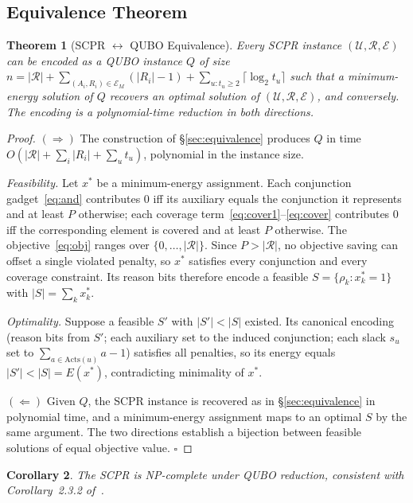 \documentclass[11pt,a4paper]{article}
\theoremstyle{plain}
\newtheorem{theorem}{Theorem}[section]
\newtheorem{corollary}[theorem]{Corollary}
\theoremstyle{definition}
\theoremstyle{remark}
\newcommand{\U}{\mathcal{U}}
\newcommand{\R}{\mathcal{R}}
\newcommand{\E}{\mathcal{E}}
\newcommand{\SCPR}{\textup{SCPR}}
\newcommand{\QUBO}{\textup{QUBO}}
\newcommand{\abs}[1]{\lvert #1 \rvert}
\newcommand{\set}[1]{\{#1\}}
\begin{document}
\subsection{Equivalence Theorem}

\begin{theorem}[\SCPR{} $\leftrightarrow$ \QUBO{} Equivalence]
\label{thm:equiv}
Every \SCPR{} instance $(\U, \R, \E)$ can be encoded as a \QUBO{} instance $Q$ of
size
$n = \abs{\R} + \sum_{(A_i,R_i)\in\E_M}(\abs{R_i}-1)
+ \sum_{u : t_u \ge 2}\lceil \log_2 t_u \rceil$
such that a minimum-energy solution of $Q$ recovers an optimal solution of
$(\U, \R, \E)$, and conversely. The encoding is a polynomial-time reduction in
both directions.
\end{theorem}

\begin{proof}
$(\Rightarrow)$ The construction of \S\ref{sec:equivalence} produces $Q$ in time
$O\!\left(\abs{\R} + \sum_i \abs{R_i} + \sum_u t_u\right)$, polynomial in the
instance size.

\textit{Feasibility.}
Let $x^{*}$ be a minimum-energy assignment. Each conjunction
gadget~\eqref{eq:and} contributes $0$ iff its auxiliary equals the conjunction it
represents and at least $P$ otherwise; each coverage
term~\eqref{eq:cover1}--\eqref{eq:cover} contributes $0$ iff the corresponding
element is covered and at least $P$ otherwise. The objective~\eqref{eq:obj} ranges
over $\set{0, \ldots, \abs{\R}}$. Since $P > \abs{\R}$, no objective saving can
offset a single violated penalty, so $x^{*}$ satisfies every conjunction and every
coverage constraint. Its reason bits therefore encode a feasible
$S = \set{\rho_k : x^{*}_k = 1}$ with $\abs{S} = \sum_k x^{*}_k$.

\textit{Optimality.}
Suppose a feasible $S'$ with $\abs{S'} < \abs{S}$ existed. Its canonical encoding
(reason bits from $S'$; each auxiliary set to the induced conjunction; each slack
$s_u$ set to $\sum_{a \in \mathrm{Acts}(u)} a - 1$) satisfies all penalties, so
its energy equals $\abs{S'} < \abs{S} = E(x^{*})$, contradicting minimality of
$x^{*}$.

$(\Leftarrow)$
Given $Q$, the \SCPR{} instance is recovered as in \S\ref{sec:equivalence} in
polynomial time, and a minimum-energy assignment maps to an optimal $S$ by the
same argument. The two directions establish a bijection between feasible solutions
of equal objective value. \hfill $\square$
\end{proof}

\begin{corollary}
The \SCPR{} is NP-complete under \QUBO{} reduction, consistent with
Corollary~2.3.2 of~\cite{babatunde2025thesis}.
\end{corollary}
\end{document}

